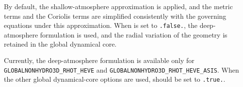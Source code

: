
By default, the shallow-atmosphere approximation is applied, 
and the metric terms and the Coriolis terms are simplified consistently with the governing equations under this approximation.
When  is set to \verb|.false.|, 
the deep-atmosphere formulation is used, 
and the radial variation of the geometry is retained in the global dynamical core.


Currently, the deep-atmosphere formulation is available only for
\verb|GLOBALNONHYDRO3D_RHOT_HEVE| and
\verb|GLOBALNONHYDRO3D_RHOT_HEVE_ASIS|.
When the other global dynamical-core options are used,
 should be set to \verb|.true.|.

